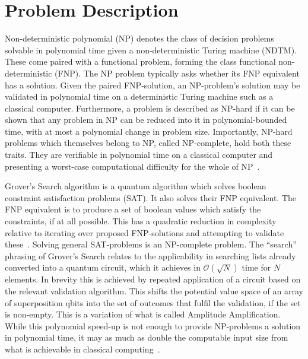 \documentclass[msc,lith,english]{liuthesis}
\author{\parbox{\textwidth}{Emil Segerbäck\\ Olav Övrebö}}
\begin{document}
\chapter{Problem Description}
Non-deterministic polynomial (NP) denotes the class of decision problems solvable in polynomial time given a non-deterministic Turing machine (NDTM). These come paired with a functional problem, forming the class functional non-deterministic (FNP). The NP problem typically asks whether its FNP equivalent has a solution. Given the paired FNP-solution, an NP-problem's solution may be validated in polynomial time on a deterministic Turing machine such as a classical computer. Furthermore, a problem is described as NP-hard if it can be shown that any problem in NP can be reduced into it in polynomial-bounded time, with at most a polynomial change in problem size. Importantly, NP-hard problems which themselves belong to NP, called NP-complete, hold both these traits. They are verifiable in polynomial time on a classical computer and presenting a worst-case computational difficulty for the whole of NP~\cite{CCAMA}.

Grover’s Search algorithm is a quantum algorithm which solves boolean constraint satisfaction problems (SAT). It also solves their FNP equivalent. The FNP equivalent is to produce a set of boolean values which satisfy the constraints, if at all possible. This has a quadratic reduction in complexity relative to iterating over proposed FNP-solutions and attempting to validate these~\cite{QCQI, CCAMA}. Solving general SAT-problems is an NP-complete problem. The “search” phrasing of Grover's Search relates to the applicability in searching lists already converted into a quantum circuit, which it achieves in $\mathcal{O}(\sqrt{N})$ time for $N$ elements. In brevity this is achieved by repeated application of a circuit based on the relevant validation algorithm. This shifts the potential value space of an array of superposition qbits into the set of outcomes that fulfil the validation, if the set is non-empty. This is a variation of what is called Amplitude Amplification. While this polynomial speed-up is not enough to provide NP-problems a solution in polynomial time, it may as much as double the computable input size from what is achievable in classical computing~\cite{EIQC}.
\end{document}
